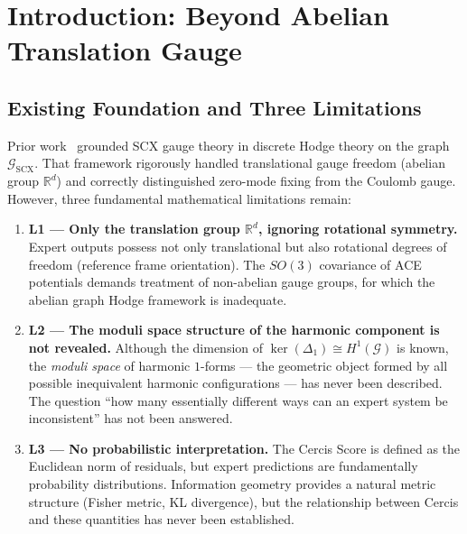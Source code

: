 \documentclass[12pt,a4paper]{article}
\theoremstyle{definition}
\theoremstyle{remark}
\theoremstyle{definition}
\newcommand{\R}{\mathbb{R}}
\newcommand{\SOthree}{SO(3)}
\newcommand{\grph}{\mathcal{G}}
\newcommand{\Lone}{\Delta_1}
\begin{document}
\begin{abstract}
\vspace{0.8em}
\noindent\textbf{Keywords:} $O(d)$ lattice gauge, ACE potential, non-abelian discrete Hodge decomposition,
Dijkgraaf-Witten TQFT, flat connection moduli space, harmonic 1-forms, first Betti number,
Fisher information metric, exponential family, KL divergence, geodesic distance,
bulk-boundary correspondence, SCX, Cercis Score, Situs manifold, 2-complex, gauge-fixing

\end{abstract}

\newpage
\tableofcontents
\newpage

\section{Introduction: Beyond Abelian Translation Gauge}
\label{sec:intro}

\subsection{Existing Foundation and Three Limitations}

Prior work~\cite{scx_fiber_bundle} grounded SCX gauge theory in discrete Hodge theory on the graph $\grph_{\text{SCX}}$.
That framework rigorously handled translational gauge freedom (abelian group $\R^d$) and correctly distinguished zero-mode fixing from the Coulomb gauge.
However, three fundamental mathematical limitations remain:

\begin{enumerate}[label=L\arabic*:, leftmargin=*]
    \item \textbf{L1 — Only the translation group $\R^d$, ignoring rotational symmetry.}
    Expert outputs possess not only translational but also rotational degrees of freedom (reference frame orientation).
    The $\SOthree$ covariance of ACE potentials demands treatment of non-abelian gauge groups, for which the abelian graph Hodge framework is inadequate.

    \item \textbf{L2 — The moduli space structure of the harmonic component is not revealed.}
    Although the dimension of $\ker(\Lone) \cong H^1(\grph)$ is known, the \textit{moduli space} of harmonic $1$-forms —
    the geometric object formed by all possible inequivalent harmonic configurations — has never been described.
    The question ``how many essentially different ways can an expert system be inconsistent'' has not been answered.

    \item \textbf{L3 — No probabilistic interpretation.}
    The Cercis Score is defined as the Euclidean norm of residuals, but expert predictions are fundamentally probability distributions.
    Information geometry provides a natural metric structure (Fisher metric, KL divergence),
    but the relationship between Cercis and these quantities has never been established.
\end{enumerate}
\end{document}
